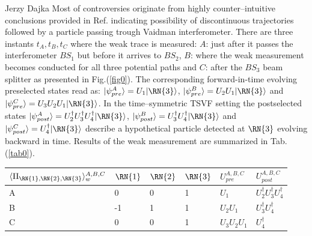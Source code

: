 \begin{artengenv}{Jerzy Dajka}
Most of controversies originate from highly counter--intuitive conclusions provided in Ref.\parencite{PhysRevA.87.052104} indicating possibility of discontinuous trajectories followed by a particle passing trough Vaidman interferometer. There are three instants $t_A,t_B,t_C$ where the weak trace is measured: $A$: just after it passes the interferometer  $BS_1$ but before it arrives to $BS_2$, $B$: where the weak measurement becomes conducted for all three potential paths and $C$: after the $BS_3$ beam splitter as presented in Fig.(\ref{fig0}). The corresponding  forward-in-time evolving preselected states read as:   
$
|\psi_{pre}^A\rangle = U_1|\RN{3}\rangle$, $
|\psi_{pre}^B\rangle = U_2U_1|\RN{3}\rangle$ and $|\psi_{pre}^C\rangle = U_3U_2U_1|\RN{3}\rangle$. 
In the time--symmetric TSVF setting the  postselected states 
$|\psi_{post}^A\rangle = U^\dagger_2U^\dagger_3U^\dagger_4|\RN{3}\rangle$, $|\psi_{post}^B\rangle =U^\dagger_3U^\dagger_4|\RN{3}\rangle$ and $|\psi_{post}^C\rangle =U^\dagger_4|\RN{3}\rangle$ describe a hypothetical particle detected at $\RN{3}$ evolving backward in time. Results of the weak measurement are summarized in Tab.(\ref{tab0}). 
%
\begin{table}[ht]
\centering
\begin{tabular}{|l||lll|ll|}
\hline
$\langle\Pi_{\RN{1},\RN{2},\RN{3}}\rangle_w^{A,B,C}$ & $\RN{1}$ & $\RN{2}$ & $\RN{3}$ &$U_{pre}^{A,B,C}$ & $U_{post}^{A,B,C}$ \\
\hline
\hline
A & 0 & 0 & 1 & $U_1$ & $U^\dagger_2U^\dagger_3U^\dagger_4$\\
B & -1 & 1 & 1 & $U_2U_1$ & $U^\dagger_3U^\dagger_4$ \\
C &  0 & 0 & 1 & $U_3U_2U_1$ & $U^\dagger_4$\\
\hline


\end{tabular}
\end{table}
\end{artengenv}
